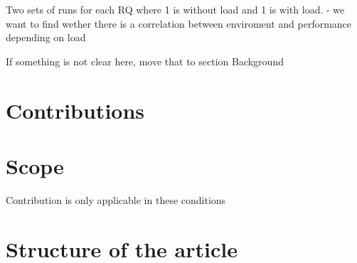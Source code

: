 Two sets of runs for each RQ where 1 is without load and 1 is with load. 
- we want to find wether there is a correlation between enviroment and performance depending on load

If something is not clear here, move that to section Background

\section{Contributions}

\section{Scope}
Contribution is only applicable in these conditions

\section{Structure of the article}